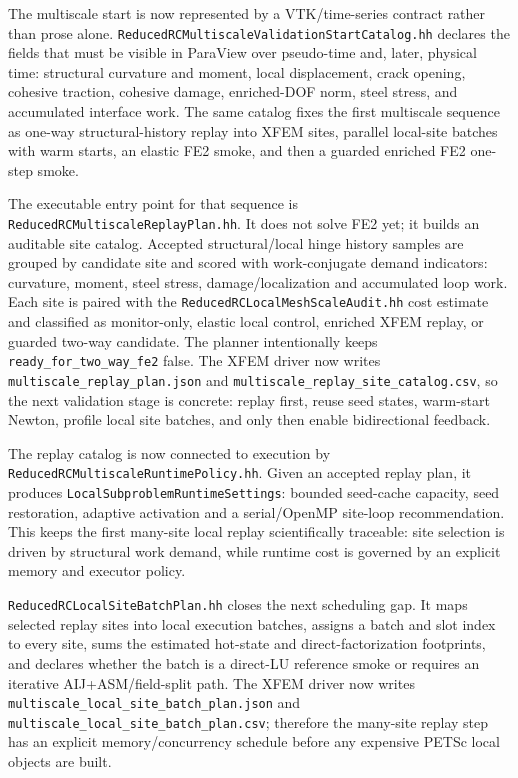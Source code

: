 The multiscale start is now represented by a VTK/time-series contract rather
than prose alone.  \texttt{ReducedRCMultiscaleValidationStartCatalog.hh}
declares the fields that must be visible in ParaView over pseudo-time and,
later, physical time: structural curvature and moment, local displacement,
crack opening, cohesive traction, cohesive damage, enriched-DOF norm, steel
stress, and accumulated interface work.  The same catalog fixes the first
multiscale sequence as one-way structural-history replay into XFEM sites,
parallel local-site batches with warm starts, an elastic FE2 smoke, and then a
guarded enriched FE2 one-step smoke.

The executable entry point for that sequence is
\texttt{ReducedRCMultiscaleReplayPlan.hh}.  It does not solve FE2 yet; it
builds an auditable site catalog.  Accepted structural/local hinge history
samples are grouped by candidate site and scored with work-conjugate demand
indicators: curvature, moment, steel stress, damage/localization and
accumulated loop work.  Each site is paired with the
\texttt{ReducedRCLocalMeshScaleAudit.hh} cost estimate and classified as
monitor-only, elastic local control, enriched XFEM replay, or guarded two-way
candidate.  The planner intentionally keeps \texttt{ready\_for\_two\_way\_fe2}
false.  The XFEM driver now writes \texttt{multiscale\_replay\_plan.json} and
\texttt{multiscale\_replay\_site\_catalog.csv}, so the next validation stage is
concrete: replay first, reuse seed states, warm-start Newton, profile local
site batches, and only then enable bidirectional feedback.

The replay catalog is now connected to execution by
\texttt{ReducedRCMultiscaleRuntimePolicy.hh}.  Given an accepted replay plan,
it produces \texttt{LocalSubproblemRuntimeSettings}: bounded seed-cache
capacity, seed restoration, adaptive activation and a serial/OpenMP
site-loop recommendation.  This keeps the first many-site local replay
scientifically traceable: site selection is driven by structural work demand,
while runtime cost is governed by an explicit memory and executor policy.

\texttt{ReducedRCLocalSiteBatchPlan.hh} closes the next scheduling gap.  It
maps selected replay sites into local execution batches, assigns a batch and
slot index to every site, sums the estimated hot-state and direct-factorization
footprints, and declares whether the batch is a direct-LU reference smoke or
requires an iterative AIJ+ASM/field-split path.  The XFEM driver now writes
\texttt{multiscale\_local\_site\_batch\_plan.json} and
\texttt{multiscale\_local\_site\_batch\_plan.csv}; therefore the many-site
replay step has an explicit memory/concurrency schedule before any expensive
PETSc local objects are built.

